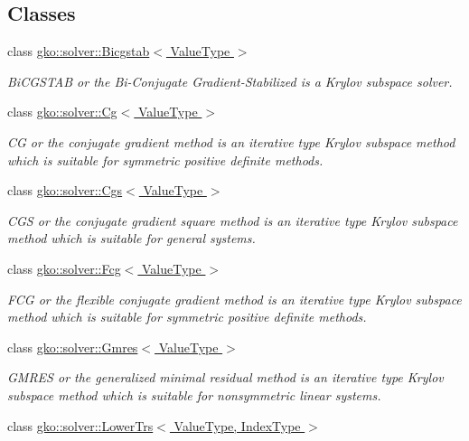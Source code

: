 \subsection*{Classes}
\begin{DoxyCompactItemize}
\item 
class \hyperlink{classgko_1_1solver_1_1Bicgstab}{gko\+::solver\+::\+Bicgstab$<$ Value\+Type $>$}
\begin{DoxyCompactList}\small\item\em Bi\+C\+G\+S\+T\+AB or the Bi-\/\+Conjugate Gradient-\/\+Stabilized is a Krylov subspace solver. \end{DoxyCompactList}\item 
class \hyperlink{classgko_1_1solver_1_1Cg}{gko\+::solver\+::\+Cg$<$ Value\+Type $>$}
\begin{DoxyCompactList}\small\item\em CG or the conjugate gradient method is an iterative type Krylov subspace method which is suitable for symmetric positive definite methods. \end{DoxyCompactList}\item 
class \hyperlink{classgko_1_1solver_1_1Cgs}{gko\+::solver\+::\+Cgs$<$ Value\+Type $>$}
\begin{DoxyCompactList}\small\item\em C\+GS or the conjugate gradient square method is an iterative type Krylov subspace method which is suitable for general systems. \end{DoxyCompactList}\item 
class \hyperlink{classgko_1_1solver_1_1Fcg}{gko\+::solver\+::\+Fcg$<$ Value\+Type $>$}
\begin{DoxyCompactList}\small\item\em F\+CG or the flexible conjugate gradient method is an iterative type Krylov subspace method which is suitable for symmetric positive definite methods. \end{DoxyCompactList}\item 
class \hyperlink{classgko_1_1solver_1_1Gmres}{gko\+::solver\+::\+Gmres$<$ Value\+Type $>$}
\begin{DoxyCompactList}\small\item\em G\+M\+R\+ES or the generalized minimal residual method is an iterative type Krylov subspace method which is suitable for nonsymmetric linear systems. \end{DoxyCompactList}\item 
class \hyperlink{classgko_1_1solver_1_1LowerTrs}{gko\+::solver\+::\+Lower\+Trs$<$ Value\+Type, Index\+Type $>$}

\end{DoxyCompactItemize}
